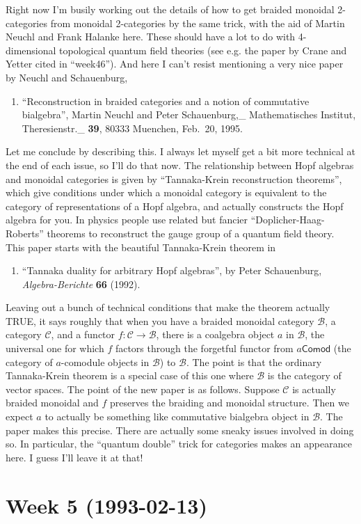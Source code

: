 \documentclass{article}
\def\tightlist{}
\begin{document}
Right now I'm busily working out the details of how to get braided
monoidal 2-categories from monoidal 2-categories by the same trick, with
the aid of Martin Neuchl and Frank Halanke here. These should have a lot
to do with 4-dimensional topological quantum field theories (see e.g.
the paper by Crane and Yetter cited in ``week46''). And here I can't
resist mentioning a very nice paper by Neuchl and Schauenburg,

\begin{enumerate}
\def\labelenumi{\arabic{enumi})}
\setcounter{enumi}{3}
\tightlist
\item
  ``Reconstruction in braided categories and a notion of commutative
  bialgebra'', Martin Neuchl and Peter Schauenburg,\_ Mathematisches
  Institut, Theresienstr.\_ \textbf{39}, 80333 Muenchen, Feb.~20, 1995.
\end{enumerate}

Let me conclude by describing this. I always let myself get a bit more
technical at the end of each issue, so I'll do that now. The
relationship between Hopf algebras and monoidal categories is given by
``Tannaka-Krein reconstruction theorems'', which give conditions under
which a monoidal category is equivalent to the category of
representations of a Hopf algebra, and actually constructs the Hopf
algebra for you. In physics people use related but fancier
``Doplicher-Haag-Roberts'' theorems to reconstruct the gauge group of a
quantum field theory. This paper starts with the beautiful Tannaka-Krein
theorem in

\begin{enumerate}
\def\labelenumi{\arabic{enumi})}
\setcounter{enumi}{4}
\tightlist
\item
  ``Tannaka duality for arbitrary Hopf algebras'', by Peter Schauenburg,
  \emph{Algebra-Berichte} \textbf{66} (1992).
\end{enumerate}

Leaving out a bunch of technical conditions that make the theorem
actually TRUE, it says roughly that when you have a braided monoidal
category \(\mathcal{B}\), a category \(\mathcal{C}\), and a functor
\(f\colon \mathcal{C} \to \mathcal{B}\), there is a coalgebra object
\(a\) in \(\mathcal{B}\), the universal one for which \(f\) factors
through the forgetful functor from \(a\mathsf{Comod}\) (the category of
\(a\)-comodule objects in \(\mathcal{B}\)) to \(\mathcal{B}\). The point
is that the ordinary Tannaka-Krein theorem is a special case of this one
where \(\mathcal{B}\) is the category of vector spaces. The point of the
new paper is as follows. Suppose \(\mathcal{C}\) is actually braided
monoidal and \(f\) preserves the braiding and monoidal structure. Then
we expect \(a\) to actually be something like commutative bialgebra
object in \(\mathcal{B}\). The paper makes this precise. There are
actually some sneaky issues involved in doing so. In particular, the
``quantum double'' trick for categories makes an appearance here. I
guess I'll leave it at that!
\hypertarget{week-5-1993-02-13}{%
\section{Week 5 (1993-02-13)}\label{week-5-1993-02-13}}
\end{document}
